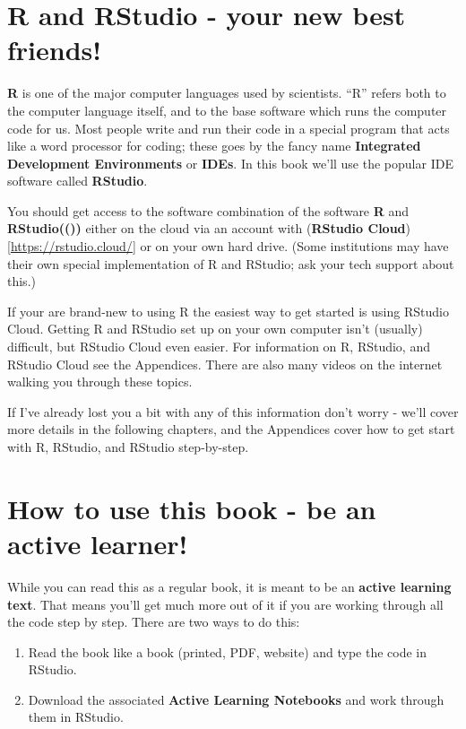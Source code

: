 \documentclass[
]{book}
\providecommand{\tightlist}{%
  \setlength{\itemsep}{0pt}\setlength{\parskip}{0pt}}
\begin{document}
\hypertarget{r-and-rstudio---your-new-best-friends}{%
\section{R and RStudio - your new best friends!}\label{r-and-rstudio---your-new-best-friends}}

\textbf{R} is one of the major computer languages used by scientists. ``R'' refers both to the computer language itself, and to the base software which runs the computer code for us. Most people write and run their code in a special program that acts like a word processor for coding; these goes by the fancy name \textbf{Integrated Development Environments} or \textbf{IDEs}. In this book we'll use the popular IDE software called \textbf{RStudio}.

You should get access to the software combination of the software \textbf{R} and \textbf{RStudio(())} either on the cloud via an account with (\textbf{RStudio Cloud}){[}\url{https://rstudio.cloud/}{]} or on your own hard drive. (Some institutions may have their own special implementation of R and RStudio; ask your tech support about this.)

If your are brand-new to using R the easiest way to get started is using RStudio Cloud. Getting R and RStudio set up on your own computer isn't (usually) difficult, but RStudio Cloud even easier. For information on R, RStudio, and RStudio Cloud see the Appendices. There are also many videos on the internet walking you through these topics.

If I've already lost you a bit with any of this information don't worry - we'll cover more details in the following chapters, and the Appendices cover how to get start with R, RStudio, and RStudio step-by-step.

\hypertarget{how-to-use-this-book---be-an-active-learner}{%
\section{How to use this book - be an active learner!}\label{how-to-use-this-book---be-an-active-learner}}

While you can read this as a regular book, it is meant to be an \textbf{active learning text}. That means you'll get much more out of it if you are working through all the code step by step. There are two ways to do this:

\begin{enumerate}
\def\labelenumi{\arabic{enumi}.}
\tightlist
\item
  Read the book like a book (printed, PDF, website) and type the code in RStudio.
\item
  Download the associated \textbf{Active Learning Notebooks} and work through them in RStudio.
\end{enumerate}
\end{document}
